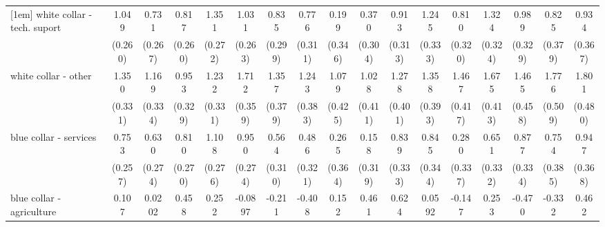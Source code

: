 {\begin{tabular}{l*{16}{c}}
[1em]
white collar - tech. suport&       1.049\sym{***}&       0.731\sym{**} &       0.817\sym{**} &       1.351\sym{***}&       1.031\sym{***}&       0.835\sym{**} &       0.776\sym{*}  &       0.199         &       0.370         &       0.913\sym{**} &       1.245\sym{***}&       0.810\sym{*}  &       1.324\sym{***}&       0.989\sym{**} &       0.825\sym{*}  &       0.934\sym{*}  \\
                    &     (0.260)         &     (0.267)         &     (0.260)         &     (0.272)         &     (0.263)         &     (0.299)         &     (0.311)         &     (0.346)         &     (0.304)         &     (0.313)         &     (0.333)         &     (0.320)         &     (0.324)         &     (0.329)         &     (0.379)         &     (0.367)         \\
[1em]
white collar - other&       1.350\sym{***}&       1.169\sym{***}&       0.953\sym{**} &       1.232\sym{***}&       1.712\sym{***}&       1.357\sym{***}&       1.243\sym{**} &       1.079\sym{*}  &       1.028\sym{*}  &       1.278\sym{**} &       1.358\sym{***}&       1.467\sym{***}&       1.675\sym{***}&       1.465\sym{**} &       1.776\sym{***}&       1.801\sym{***}\\
                    &     (0.331)         &     (0.334)         &     (0.329)         &     (0.331)         &     (0.359)         &     (0.379)         &     (0.383)         &     (0.425)         &     (0.411)         &     (0.401)         &     (0.393)         &     (0.417)         &     (0.413)         &     (0.458)         &     (0.509)         &     (0.480)         \\
[1em]
blue collar - services&       0.753\sym{**} &       0.630\sym{*}  &       0.810\sym{**} &       1.108\sym{***}&       0.950\sym{***}&       0.564         &       0.486         &       0.265         &       0.158         &       0.839\sym{*}  &       0.845\sym{*}  &       0.280         &       0.651\sym{*}  &       0.877\sym{**} &       0.754         &       0.947\sym{**} \\
                    &     (0.257)         &     (0.274)         &     (0.270)         &     (0.276)         &     (0.274)         &     (0.310)         &     (0.321)         &     (0.364)         &     (0.319)         &     (0.333)         &     (0.344)         &     (0.337)         &     (0.332)         &     (0.334)         &     (0.385)         &     (0.368)         \\
[1em]
blue collar - agriculture&       0.107         &      0.0202         &       0.458         &       0.252         &     -0.0897         &      -0.211         &      -0.408         &       0.152         &       0.461         &       0.624         &      0.0592         &      -0.147         &       0.253         &      -0.470         &      -0.332         &       0.462         \\

\end{tabular}}

